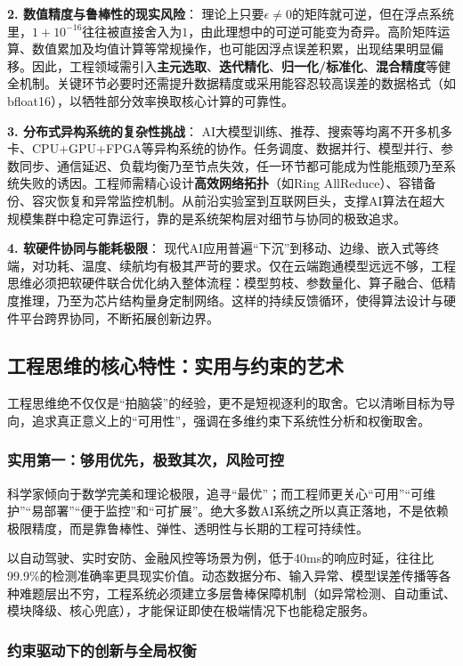 \textbf{2. 数值精度与鲁棒性的现实风险}：
理论上只要$\epsilon\neq0$的矩阵就可逆，但在浮点系统里，$1+10^{-16}$往往被直接舍入为$1$，由此理想中的可逆可能变为奇异。高阶矩阵运算、数值累加及均值计算等常规操作，也可能因浮点误差积累，出现结果明显偏移。因此，工程领域需引入\textbf{主元选取}、\textbf{迭代精化}、\textbf{归一化/标准化}、\textbf{混合精度}等健全机制。关键环节必要时还需提升数据精度或采用能容忍较高误差的数据格式（如bfloat16），以牺牲部分效率换取核心计算的可靠性。

\textbf{3. 分布式异构系统的复杂性挑战}：
AI大模型训练、推荐、搜索等均离不开多机多卡、CPU+GPU+FPGA等异构系统的协作。任务调度、数据并行、模型并行、参数同步、通信延迟、负载均衡乃至节点失效，任一环节都可能成为性能瓶颈乃至系统失败的诱因。工程师需精心设计\textbf{高效网络拓扑}（如Ring AllReduce）、容错备份、容灾恢复和异常监控机制。从前沿实验室到互联网巨头，支撑AI算法在超大规模集群中稳定可靠运行，靠的是系统架构层对细节与协同的极致追求。

\textbf{4. 软硬件协同与能耗极限}：
现代AI应用普遍“下沉”到移动、边缘、嵌入式等终端，对功耗、温度、续航均有极其严苛的要求。仅在云端跑通模型远远不够，工程思维必须把软硬件联合优化纳入整体流程：模型剪枝、参数量化、算子融合、低精度推理，乃至为芯片结构量身定制网络。这样的持续反馈循环，使得算法设计与硬件平台跨界协同，不断拓展创新边界。

\subsection{工程思维的核心特性：实用与约束的艺术}

工程思维绝不仅仅是“拍脑袋”的经验，更不是短视逐利的取舍。它以清晰目标为导向，追求真正意义上的“可用性”，强调在多维约束下系统性分析和权衡取舍。

\subsubsection{实用第一：够用优先，极致其次，风险可控}

科学家倾向于数学完美和理论极限，追寻“最优”；而工程师更关心“可用”“可维护”“易部署”“便于监控”和“可扩展”。绝大多数AI系统之所以真正落地，不是依赖极限精度，而是靠鲁棒性、弹性、透明性与长期的工程可持续性。

以自动驾驶、实时安防、金融风控等场景为例，低于40ms的响应时延，往往比99.9\%的检测准确率更具现实价值。动态数据分布、输入异常、模型误差传播等各种难题层出不穷，工程系统必须建立多层鲁棒保障机制（如异常检测、自动重试、模块降级、核心兜底），才能保证即使在极端情况下也能稳定服务。

\subsubsection{约束驱动下的创新与全局权衡}

